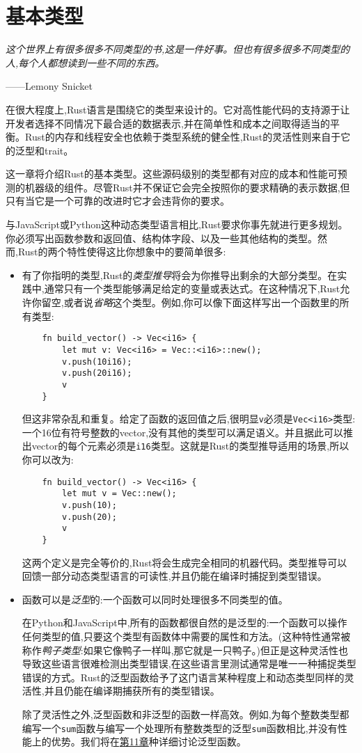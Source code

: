 \chapter{基本类型}\label{ch03}
\emph{这个世界上有很多很多不同类型的书,这是一件好事。但也有很多很多不同类型的人,每个人都想读到一些不同的东西。}
\begin{flushright}
    ——Lemony Snicket
\end{flushright}

在很大程度上,Rust语言是围绕它的类型来设计的。它对高性能代码的支持源于让开发者选择不同情况下最合适的数据表示,并在简单性和成本之间取得适当的平衡。Rust的内存和线程安全也依赖于类型系统的健全性,Rust的灵活性则来自于它的泛型和trait。

这一章将介绍Rust的基本类型。这些源码级别的类型都有对应的成本和性能可预测的机器级的组件。尽管Rust并不保证它会完全按照你的要求精确的表示数据,但只有当它是一个可靠的改进时它才会违背你的要求。

与JavaScript或Python这种动态类型语言相比,Rust要求你事先就进行更多规划。你必须写出函数参数和返回值、结构体字段、以及一些其他结构的类型。然而,Rust的两个特性使得这比你想象中的要简单很多:

\begin{itemize}
    \item 有了你指明的类型,Rust的\emph{类型推导}将会为你推导出剩余的大部分类型。在实践中,通常只有一个类型能够满足给定的变量或表达式。在这种情况下,Rust允许你留空,或者说\emph{省略}这个类型。例如,你可以像下面这样写出一个函数里的所有类型:
    \begin{verbatim}
    fn build_vector() -> Vec<i16> {
        let mut v: Vec<i16> = Vec::<i16>::new();
        v.push(10i16);
        v.push(20i16);
        v
    }
    \end{verbatim}
    但这非常杂乱和重复。给定了函数的返回值之后,很明显\texttt{v}必须是\texttt{Vec<i16>}类型:一个16位有符号整数的vector,没有其他的类型可以满足语义。并且据此可以推出vector的每个元素必须是\texttt{i16}类型。这就是Rust的类型推导适用的场景,所以你可以改为:
    \begin{verbatim}
    fn build_vector() -> Vec<i16> {
        let mut v = Vec::new();
        v.push(10);
        v.push(20);
        v
    }
    \end{verbatim}
    这两个定义是完全等价的,Rust将会生成完全相同的机器代码。类型推导可以回馈一部分动态类型语言的可读性,并且仍能在编译时捕捉到类型错误。
    \item 函数可以是\emph{泛型}的:一个函数可以同时处理很多不同类型的值。

    在Python和JavaScript中,所有的函数都很自然的是泛型的:一个函数可以操作任何类型的值,只要这个类型有函数体中需要的属性和方法。(这种特性通常被称作\emph{鸭子类型}:如果它像鸭子一样叫,那它就是一只鸭子。)但正是这种灵活性也导致这些语言很难检测出类型错误,在这些语言里测试通常是唯一一种捕捉类型错误的方式。Rust的泛型函数给予了这门语言某种程度上和动态类型同样的灵活性,并且仍能在编译期捕获所有的类型错误。

    除了灵活性之外,泛型函数和非泛型的函数一样高效。例如,为每个整数类型都编写一个\texttt{sum}函数与编写一个处理所有整数类型的泛型\texttt{sum}函数相比,并没有性能上的优势。我们将在\hyperref[ch11]{第11章}种详细讨论泛型函数。
\end{itemize}

